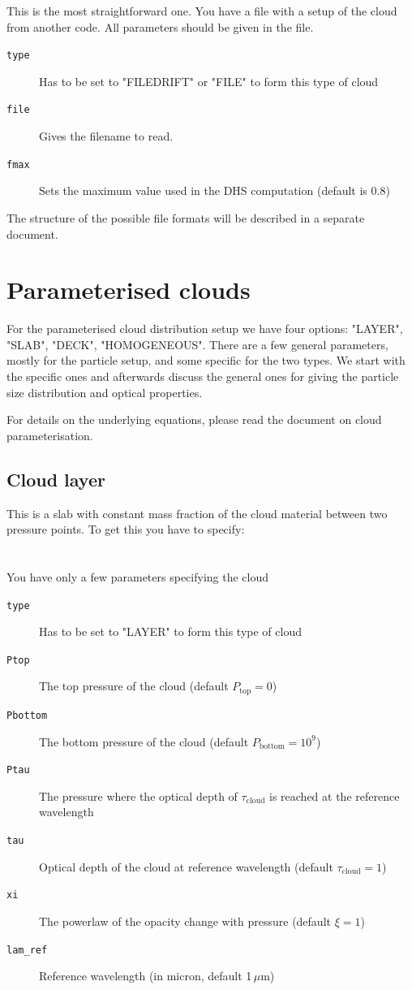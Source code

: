 \documentclass[12pt]{article}
\begin{document}
This is the most straightforward one. You have a file with a setup of the cloud from another code. All parameters should be given in the file.

\begin{description}
\item[\texttt{type}]
Has to be set to "FILEDRIFT" or "FILE" to form this type of cloud
\item[\texttt{file}]
Gives the filename to read.
\item[\texttt{fmax}]
Sets the maximum value used in the DHS computation (default is 0.8)
\end{description}
The structure of the possible file formats will be described in a separate document.

\section{Parameterised clouds}

For the parameterised cloud distribution setup we have four options: "LAYER", "SLAB", "DECK", "HOMOGENEOUS".
There are a few general parameters, mostly for the particle setup, and some specific for the two types. We start with the specific ones and afterwards discuss the general ones for giving the particle size distribution and optical properties.

For details on the underlying equations, please read the document on cloud parameterisation.

\subsection{Cloud layer}

This is a slab with constant mass fraction of the cloud material between two pressure points. To get this you have to specify:
\\
\\
\\
You have only a few parameters specifying the cloud

\begin{description}
\item[\texttt{type}]
Has to be set to "LAYER" to form this type of cloud
\item[\texttt{Ptop}]
The top pressure of the cloud (default $P_\mathrm{top}=0$)
\item[\texttt{Pbottom}]
The bottom pressure of the cloud (default $P_\mathrm{bottom}=10^9$)
\item[\texttt{Ptau}]
The pressure where the optical depth of $\tau_\mathrm{cloud}$ is reached at the reference wavelength
\item[\texttt{tau}]
Optical depth of the cloud at reference wavelength (default $\tau_\mathrm{cloud}=1$)
\item[\texttt{xi}]
The powerlaw of the opacity change with pressure (default $\xi=1$)
\item[\texttt{lam\_ref}]
Reference wavelength (in micron, default 1\,$\mu$m)
\end{description}
\end{document}
